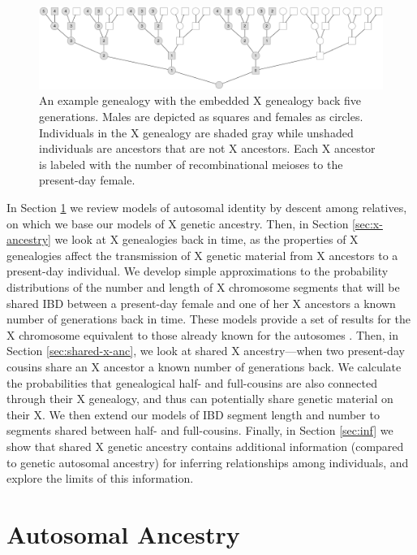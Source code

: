 \documentclass[11pt]{article}
\begin{document}
\begin{figure}[!ht]
  \centering
  \includegraphics[width=\textwidth]{images/x-rm-tree.eps}

  \caption{An example genealogy with the embedded X genealogy back five
    generations. Males are depicted as squares and females as circles.
    Individuals in the X genealogy are shaded gray while unshaded individuals
    are ancestors that are not X ancestors. Each X ancestor is labeled with the
  number of recombinational meioses to the present-day female.}
  \label{fig:x-rm-tree}
\end{figure}

In Section \ref{sec:auto-ancestry} we review models of autosomal identity by
descent among relatives, on which we base our models of X genetic ancestry.
Then, in Section \ref{sec:x-ancestry} we look at X genealogies back in time, as
the properties of X genealogies affect the transmission of X genetic material
from X ancestors to a present-day individual. We develop simple approximations
to the probability distributions of the number and length of X chromosome
segments that will be shared IBD between a present-day female and one of her X
ancestors a known number of generations back in time. These models provide a
set of results for the X chromosome equivalent to those already known for the
autosomes \citep{Donnelly:1983fi,thomas:1994hg}. Then, in Section
\ref{sec:shared-x-anc}, we look at shared X ancestry---when two present-day
cousins share an X ancestor a known number of generations back. We calculate
the probabilities that genealogical half- and full-cousins are also connected
through their X genealogy, and thus can potentially share genetic material on
their X. We then extend our models of IBD segment length and number to segments
shared between half- and full-cousins. Finally, in Section \ref{sec:inf} we
show that shared X genetic ancestry contains additional information (compared
to genetic autosomal ancestry) for inferring relationships among individuals,
and explore the limits of this information. 

\section{Autosomal Ancestry}
\label{sec:auto-ancestry}
\end{document}

